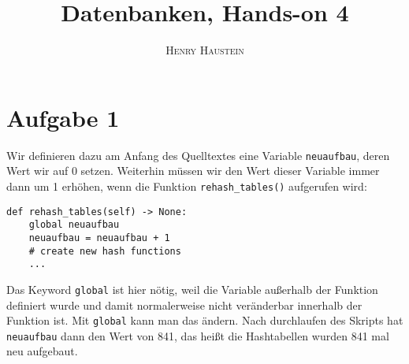 \documentclass{article}
\title{\textbf{Datenbanken, Hands-on 4}}
\author{\textsc{Henry Haustein}}
\date{}
\begin{document}
	\maketitle

	\section*{Aufgabe 1}
	Wir definieren dazu am Anfang des Quelltextes eine Variable \texttt{neuaufbau}, deren Wert wir auf 0 setzen. Weiterhin müssen wir den Wert dieser Variable immer dann um 1 erhöhen, wenn die Funktion \texttt{rehash\_tables()} aufgerufen wird:
	\begin{lstlisting}[style=python,tabsize=2]
def rehash_tables(self) -> None:
	global neuaufbau
	neuaufbau = neuaufbau + 1
	# create new hash functions
	...
	\end{lstlisting}
	Das Keyword \texttt{global} ist hier nötig, weil die Variable außerhalb der Funktion definiert wurde und damit normalerweise nicht veränderbar innerhalb der Funktion ist. Mit \texttt{global} kann man das ändern. Nach durchlaufen des Skripts hat \texttt{neuaufbau} dann den Wert von 841, das heißt die Hashtabellen wurden 841 mal neu aufgebaut.
\end{document}
